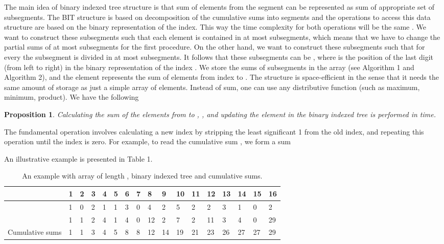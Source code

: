 \documentclass[11pt,letter]{article}
\newtheorem{prop}[thm]{Proposition}
\begin{document}
The main idea of binary indexed tree structure is that sum of elements from the segment 
can be represented as sum of appropriate set of subsegments. The BIT structure is based on
decomposition of the cumulative sums into segments and the operations to access this data structure
are based on the binary representation of the index. This way the time complexity for both
operations will be the same . We want to construct these subsegments such that each
element is contained in at most  subsegments, which means that we have to change the
partial sums of at most  subsegments for the first procedure. On the other hand, we want to
construct these subsegments such that for every  the subsegment  is
divided in at most  subsegments. It follows that these subsegments can be , where  is the position of the last digit  (from left to right) in the binary
representation of the index . We store the sums of subsegments in the array  (see
Algorithm 1 and Algorithm 2), and the element  represents the sum of elements from index
 to . The structure is space-efficient in the sense that it needs the same
amount of storage as just a simple array of  elements. Instead of sum, one can use any
distributive function (such as maximum, minimum, product). We have the following

\begin{prop}
Calculating the sum of the elements from  to , , and updating the
element  in the binary indexed tree is performed in  time.
\end{prop}

The fundamental operation involves calculating a new index by stripping the least significant 1
from the old index, and repeating this operation until the index is zero. For example, to read the
cumulative sum , we form a sum

An illustrative example is presented in Table 1.

\begin{table}[ht]
\centering \begin{tabular} {l|llllllllllllllll}
\toprule

 & 1 &  2 &  3 &  4  & 5 &  6 &  7 &  8 &  9 &  10 & 11 & 12 & 13 & 14 & 15  & 16 \\
\midrule
 &  1 &  0 &  2 &  1 &  1 &  3 &  0 &  4 &  2 & 5 &  2 &  2 &  3 &  1 &  0 &  2 \\
 &  1 & 1 &  2 & 4 &  1 &  4 & 0 & 12 & 2 & 7 & 2 &  11 & 3 &  4 & 0 & 29\\
Cumulative sums &  1 &  1 &  3 &  4  & 5 &  8 &  8 &  12 & 14 & 19 & 21 & 23 & 26 & 27 & 27 & 29 \\
\bottomrule
\end{tabular}

\caption{An example with array  of length , binary indexed tree  and cumulative
sums.}
\end{table}
\end{document}
